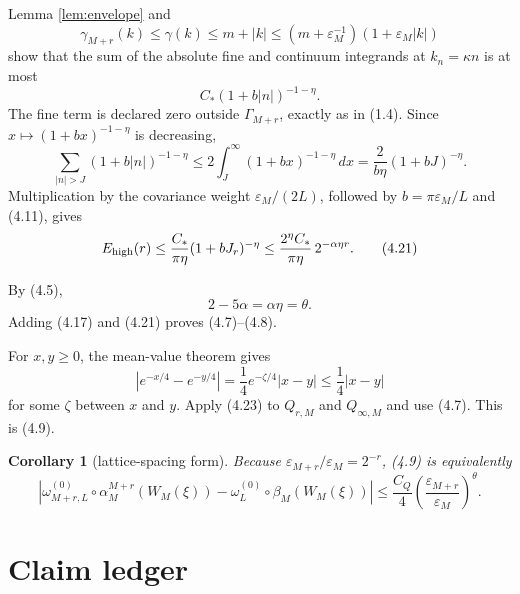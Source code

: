 \documentclass[11pt,a4paper]{article}
\newcommand{\eps}{\varepsilon}
\newcommand{\dd}{\,d}
\newtheorem{corollary}[theorem]{Corollary}
\begin{document}

Lemma \ref{lem:envelope} and
\[
 \gamma_{M+r}(k)\le\gamma(k)\le m+|k|
 \le(m+\eps_M^{-1})(1+\eps_M|k|)                              \tag{4.18}
\]
show that the sum of the absolute fine and continuum integrands at
\(k_n=\kappa n\) is at most
\[
 C_*(1+b|n|)^{-1-\eta}.                                       \tag{4.19}
\]
The fine term is declared zero outside \(\Gamma_{M+r}\), exactly as in (1.4).
Since \(x\mapsto(1+bx)^{-1-\eta}\) is decreasing,
\[
 \sum_{|n|>J}(1+b|n|)^{-1-\eta}
 \le2\int_J^\infty(1+bx)^{-1-\eta}\dd x
 =\frac{2}{b\eta}(1+bJ)^{-\eta}.                              \tag{4.20}
\]
Multiplication by the covariance weight \(\eps_M/(2L)\), followed by
\(b=\pi\eps_M/L\) and (4.11), gives
\[
 E_{\rm high}(r)
 \le\frac{C_*}{\pi\eta}(1+bJ_r)^{-\eta}
 \le\frac{2^\eta C_*}{\pi\eta}\,2^{-\alpha\eta r}.             \tag{4.21}
\]


By (4.5),
\[
 2-5\alpha=\alpha\eta=\theta.                                 \tag{4.22}
\]
Adding (4.17) and (4.21) proves (4.7)--(4.8).


For \(x,y\ge0\), the mean-value theorem gives
\[
 |e^{-x/4}-e^{-y/4}|
 =\frac14e^{-\zeta/4}|x-y|
 \le\frac14|x-y|                                               \tag{4.23}
\]
for some \(\zeta\) between \(x\) and \(y\).  Apply (4.23) to
\(Q_{r,M}\) and \(Q_{\infty,M}\) and use (4.7).  This is (4.9).
\QedStep

\begin{corollary}[lattice-spacing form]
Because \(\eps_{M+r}/\eps_M=2^{-r}\), (4.9) is equivalently
\[
 |\omega_{M+r,L}^{(0)}\circ\alpha_M^{M+r}(W_M(\xi))
 -\omega_L^{(0)}\circ\beta_M(W_M(\xi))|
 \le\frac{C_Q}{4}\left(\frac{\eps_{M+r}}{\eps_M}\right)^\theta.
                                                                    \tag{4.24}
\]
\end{corollary}

\section{Claim ledger}
\end{document}
